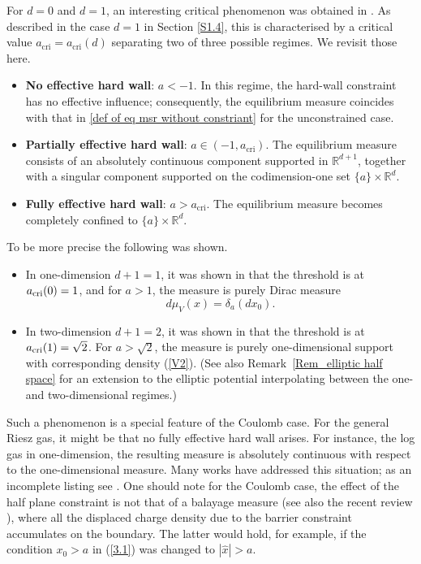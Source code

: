 \documentclass[10pt]{amsart}
\theoremstyle{plain}
\theoremstyle{remark}
\numberwithin{equation}{section}
\begin{document}
For \( d = 0 \) and \( d = 1 \), an interesting critical phenomenon was obtained in \cite{DKMSS17, ASZ14}. As described in the case $d=1$ in Section \ref{S1.4}, this is characterised by a critical value \( a_{\mathrm{cri}} = a_{\mathrm{cri}}(d) \) separating two of three possible regimes. We revisit those here. 
\begin{itemize}
    \item[(i)] \textbf{No effective hard wall}: \( a < -1 \). In this regime, the hard-wall constraint has no effective influence; consequently, the equilibrium measure coincides with that in \eqref{def of eq msr without constriant} for the unconstrained case.
    \smallskip
    \item[(ii)] \textbf{Partially effective hard wall}: \( a \in (-1, a_{\mathrm{cri}}) \). The equilibrium measure consists of an absolutely continuous component supported in \( \mathbb{R}^{d+1} \), together with a singular component supported on the codimension-one set \( \{a\} \times \mathbb{R}^d \).
    \smallskip
    \item[(iii)] \textbf{Fully effective hard wall}: \( a > a_{\mathrm{cri}} \). The equilibrium measure becomes completely confined to \( \{a\} \times \mathbb{R}^d \).
\end{itemize}

To be more precise the following was shown.
\begin{itemize}
    \item In one-dimension $d+1=1$, it was shown in \cite{DKMSS17} that the threshold is at $a_{ \rm cri }(0)=1$, and for $a>1$, the measure is purely Dirac measure 
    \begin{equation}
    d\mu_V(x)= \delta_a(dx_0). 
    \end{equation} 
    \item In two-dimension $d+1=2$, it was shown in \cite{ASZ14} that the threshold is at $a_{ \rm cri }(1)=\sqrt{2}$. For $a>\sqrt{2}$, the measure is purely one-dimensional support 
    with corresponding density (\ref{V2}). (See also Remark~\ref{Rem_elliptic half space} for an extension to the elliptic potential interpolating between the one- and two-dimensional regimes.)
\end{itemize} 
Such a phenomenon is a special feature of the Coulomb case. For the general Riesz gas, it might be that no fully effective hard wall arises. For instance, the log gas in one-dimension, the resulting measure is absolutely continuous with respect to the one-dimensional measure. Many works have addressed this situation; as an incomplete listing see \cite{DM06,DM08,MNSV09,BDG01,KC10,RKC12,MV09,FW12,MS14}.
One should note for the Coulomb case,  the effect of the half plane constraint is not that of a balayage measure \cite{AR17, Ad18, Ch23a} (see also the recent review \cite[Section 5]{BF25a}), where all the displaced charge density due to the barrier constraint accumulates on the boundary.
The latter would hold,
 for example, if the condition $x_0 > a$ in (\ref{3.1}) was changed to $|\hat{x}| > a$. 
\end{document}
